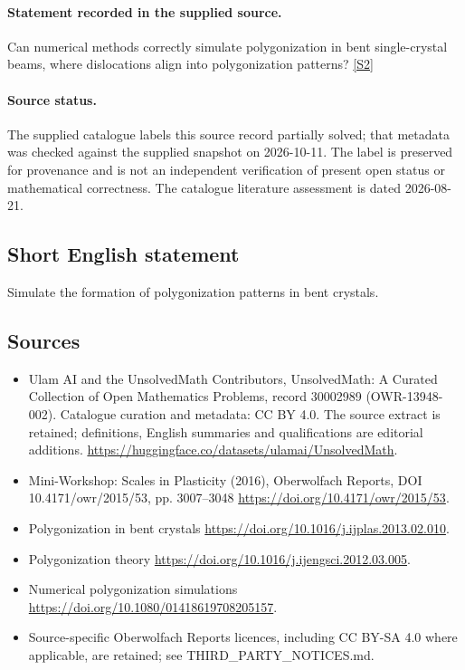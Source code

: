\documentclass[11pt]{article}
\begin{document}
\paragraph{Statement recorded in the supplied source.}
Can numerical methods correctly simulate polygonization in bent single-crystal beams, where dislocations align into polygonization patterns? \href{https://doi.org/10.4171/owr/2015/53}{[S2]}
\paragraph{Source status.}
The supplied catalogue labels this source record partially solved; that metadata was checked against the supplied snapshot on 2026-10-11. The label is preserved for provenance and is not an independent verification of present open status or mathematical correctness. The catalogue literature assessment is dated 2026-08-21.
\subsection{Short English statement}
Simulate the formation of polygonization patterns in bent crystals.
\subsection{Sources}
\begin{itemize}
\item[S1] Ulam AI and the UnsolvedMath Contributors, UnsolvedMath: A Curated Collection of Open Mathematics Problems, record 30002989 (OWR-13948-002). Catalogue curation and metadata: CC BY 4.0. The source extract is retained; definitions, English summaries and qualifications are editorial additions.
\url{https://huggingface.co/datasets/ulamai/UnsolvedMath}.
\item[S2] Mini-Workshop: Scales in Plasticity (2016), Oberwolfach Reports, DOI 10.4171/owr/2015/53, pp. 3007--3048
\url{https://doi.org/10.4171/owr/2015/53}.
\item[S3] Polygonization in bent crystals
\url{https://doi.org/10.1016/j.ijplas.2013.02.010}.
\item[S4] Polygonization theory
\url{https://doi.org/10.1016/j.ijengsci.2012.03.005}.
\item[S5] Numerical polygonization simulations
\url{https://doi.org/10.1080/01418619708205157}.
\item Source-specific Oberwolfach Reports licences, including CC BY-SA 4.0 where applicable, are retained; see THIRD\_PARTY\_NOTICES.md.
\end{itemize}
\end{document}
